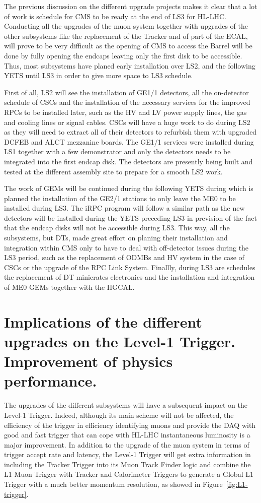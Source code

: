 	The previous discussion on the different upgrade projects makes it clear that a lot of work is schedule for CMS to be ready at the end of LS3 for HL-LHC. Conducting all the upgrades of the muon system together with upgrades of the other subsystems like the replacement of the Tracker and of part of the ECAL, will prove to be very difficult as the opening of CMS to access the Barrel will be done by fully opening the endcaps leaving only the first disk to be accessible. Thus, most subsystems have planed early installation over LS2, and the following YETS until LS3 in order to give more space to LS3 schedule.
	
	First of all, LS2 will see the installation of GE1/1 detectors, all the on-detector schedule of CSCs and the installation of the necessary services for the improved RPCs to be installed later, such as the HV and LV power supply lines, the gas and cooling lines or signal cables. CSCs will have a huge work to do during LS2 as they will need to extract all of their detectors to refurbish them with upgraded DCFEB and ALCT mezzanine boards. The GE1/1 services were installed during LS1 together with a few demonstrator and only the detectors needs to be integrated into the first endcap disk. The detectors are presently being built and tested at the different assembly site to prepare for a smooth LS2 work.
	
	The work of GEMs will be continued during the following YETS during which is planned the installation of the GE2/1 stations to only leave the ME0 to be installed during LS3. The iRPC program will follow a similar path as the new detectors will be installed during the YETS preceding LS3 in prevision of the fact that the endcap disks will not be accessible during LS3. This way, all the subsystems, but DTs, made great effort on planing their installation and integration within CMS only to have to deal with off-detector issues during the LS3 period, such as the replacement of ODMBs and HV system in the case of CSCs or the upgrade of the RPC Link System. Finallly, during LS3 are schedules the replacement of DT minicrates electronics and the installation and integration of ME0 GEMs together with the HGCAL.
	
\section{Implications of the different upgrades on the Level-1 Trigger. Improvement of physics performance.}
\label{chapt3:sec:L1tP2}

	The upgrades of the different subsystems will have a subsequent impact on the Level-1 Trigger. Indeed, although its main scheme will not be affected, the efficiency of the trigger in efficiency identifying muons and provide the DAQ with good and fast trigger that can cope with HL-LHC instantaneous luminosity is a major improvement. In addition to the upgrade of the muon system in terms of trigger accept rate and latency, the Level-1 Trigger will get extra information in including the Tracker Trigger into its Muon Track Finder logic and combine the L1 Muon Trigger with Tracker and Calorimeter Triggers to generate a Global L1 Trigger with a much better momentum resolution, as showed in Figure~\ref{fig:L1-trigger}.

